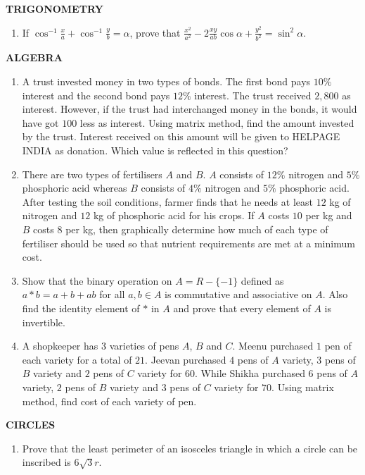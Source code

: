 \documentclass[12pt,-letter paper]{article}
\begin{document}
\begin{center}
	\textbf{TRIGONOMETRY}
\end{center}
\begin{enumerate}
\item If $\cos^{-1}\frac{x}{a}+\cos^{-1}\frac{y}{b}=\alpha$, prove that $\frac{x^2}{a^2}-2\frac{xy}{ab}\cos\alpha+\frac{y^2}{b^2}=\sin^2\alpha$.
\end{enumerate}
\begin{center}
	\textbf{ALGEBRA}
\end{center}
\begin{enumerate}
\item A trust invested money in two types of bonds. The first bond pays $10\%$ interest and the second bond pays $12\%$ interest. The trust received \rupee$2,800$ as interest. However, if the trust had interchanged money in the bonds, it would have got \rupee$100$ less as interest. Using matrix method, find the amount invested by the trust. Interest received on this amount will be given to HELPAGE INDIA as donation. Which value is reflected in this question? 
\item There are two types of fertilisers $A$ and $B$. $A$ consists of $12\%$ nitrogen and $5\%$ phosphoric acid whereas $B$ consists of $4\%$ nitrogen and $5\%$ phosphoric acid. After testing the soil conditions, farmer finds that he needs at least $12$ kg of nitrogen and $12$ kg of phosphoric acid for his crops. If $A$ costs $10$ per kg and $B$ costs $8$ per kg, then graphically determine how much of each type of fertiliser should be used so that nutrient requirements are met at a minimum cost.
\item Show that the binary operation on $A=R-\{-1\}$ defined as $a*b=a+b+ab$ for all $a, b \in A$ is commutative and associative on $A$. Also find the identity element of $*$ in $A$ and prove that every element of $A$ is invertible.
\item A shopkeeper has $3$ varieties of pens $A$, $B$ and $C$. Meenu purchased $1$ pen of each variety for a total of \rupee$21$. Jeevan purchased $4$ pens of $A$ variety, $3$ pens of $B$ variety and $2$ pens of $C$ variety for \rupee$60$. While Shikha purchased 6 pens of $A$ variety, $2$ pens of $B$ variety and $3$ pens of $C$ variety for \rupee$70$. Using matrix method, find cost of each variety of pen.
\end{enumerate}
\begin{center}
	\textbf{CIRCLES}
\end{center}
\begin{enumerate}
\item Prove that the least perimeter of an isosceles triangle in which a circle can be inscribed is 
$6\sqrt{3}r$.

\end{enumerate}
\end{document}

